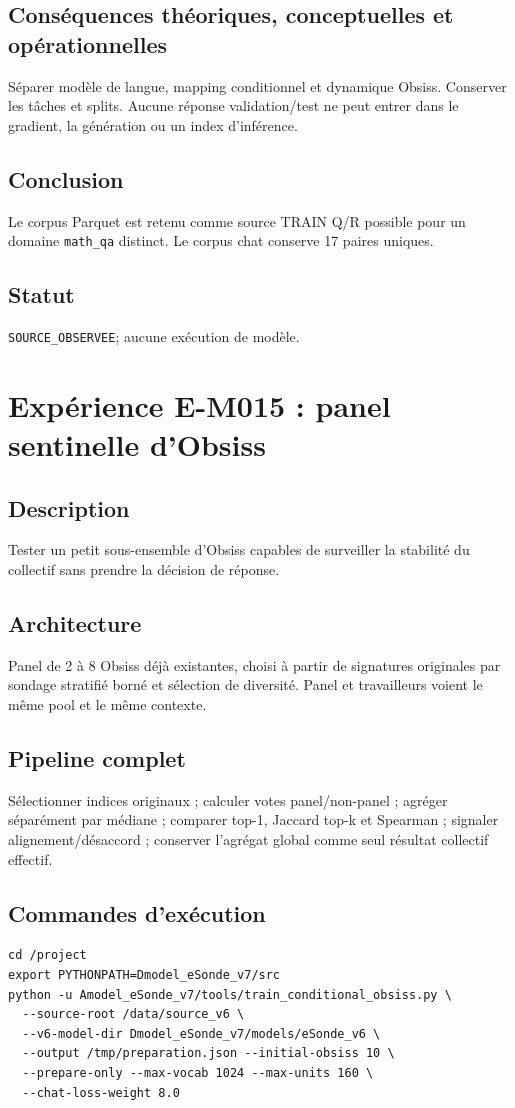 \documentclass[11pt,a4paper]{report}
\begin{document}
\subsection{Conséquences théoriques, conceptuelles et opérationnelles}
Séparer modèle de langue, mapping conditionnel et dynamique Obsiss. Conserver les tâches et splits. Aucune réponse validation/test ne peut entrer dans le gradient, la génération ou un index d'inférence.
\subsection{Conclusion}
Le corpus Parquet est retenu comme source TRAIN Q/R possible pour un domaine \texttt{math\_qa} distinct. Le corpus chat conserve 17 paires uniques.
\subsection{Statut}
\texttt{SOURCE\_OBSERVEE}; aucune exécution de modèle.

\section{Expérience E-M015 : panel sentinelle d'Obsiss}
\subsection{Description}
Tester un petit sous-ensemble d'Obsiss capables de surveiller la stabilité du collectif sans prendre la décision de réponse.
\subsection{Architecture}
Panel de 2 à 8 Obsiss déjà existantes, choisi à partir de signatures originales par sondage stratifié borné et sélection de diversité. Panel et travailleurs voient le même pool et le même contexte.
\subsection{Pipeline complet}
Sélectionner indices originaux ; calculer votes panel/non-panel ; agréger séparément par médiane ; comparer top-1, Jaccard top-k et Spearman ; signaler alignement/désaccord ; conserver l'agrégat global comme seul résultat collectif effectif.
\subsection{Commandes d'exécution}
\begin{verbatim}
cd /project
export PYTHONPATH=Dmodel_eSonde_v7/src
python -u Amodel_eSonde_v7/tools/train_conditional_obsiss.py \
  --source-root /data/source_v6 \
  --v6-model-dir Dmodel_eSonde_v7/models/eSonde_v6 \
  --output /tmp/preparation.json --initial-obsiss 10 \
  --prepare-only --max-vocab 1024 --max-units 160 \
  --chat-loss-weight 8.0
\end{verbatim}
\end{document}
